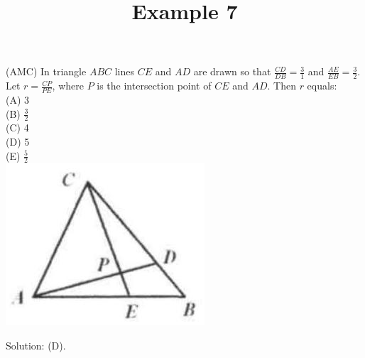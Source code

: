 \documentclass{article}
\title{Example 7}
\date{}
\begin{document}
\maketitle

(AMC) In triangle \(A B C\) lines \(C E\) and \(A D\) are drawn so that \(\frac{C D}{D B}=\frac{3}{1}\) and \(\frac{A E}{E B}=\frac{3}{2}\). Let \(r=\frac{C P}{P E}\), where \(P\) is the intersection point of \(C E\) and \(A D\). Then \(r\) equals:\\
(A) 3\\
(B) \(\frac{3}{2}\)\\
(C) 4\\
(D) 5\\
(E) \(\frac{5}{2}\)\\
\centering
\includegraphics[width=\textwidth]{images/problem_image_1.jpg}

Solution: (D).
\end{document}
